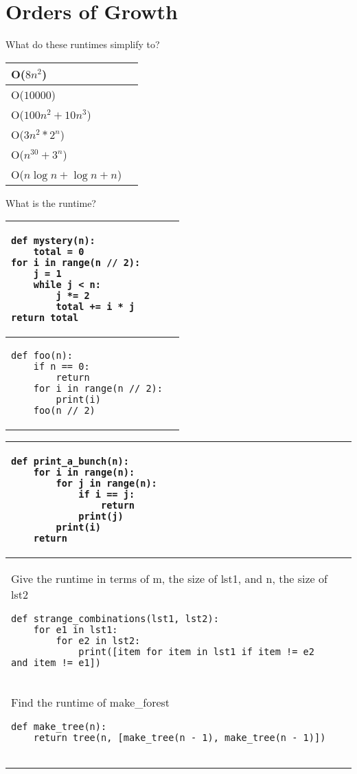\documentclass{exam}
\begin{document}
\section{Orders of Growth}
\begin{questions}
\item What do these runtimes simplify to? \newline
\begin{tabular}{ |p{4cm}|p{4cm}| } 
\hline 
O($8n^{2}$)&  \\ \hline
O($10000$) & \\ \hline
O($100n^{2} + 10n^{3}$) & \\ \hline
O($3n^{2}*2^{n}$) & \\ \hline
O($n^{30}+3^{n}$) & \\ \hline
O($n\log{n} + \log{n} + n$) & \\ \hline
\end{tabular}

\item What is the runtime?
\begin{center}

\begin{tabular}{ |p{13cm}|p{2cm}| } 
 \hline
 \begin{lstlisting}
def mystery(n):
    total = 0
for i in range(n // 2):
    j = 1
    while j < n:
        j *= 2
        total += i * j
return total
\end{lstlisting} &  \\  \hline

 \begin{lstlisting}
def foo(n):
    if n == 0:
        return
    for i in range(n // 2):
        print(i)
    foo(n // 2)
\end{lstlisting} &  \\  \hline
\end{tabular}

\begin{tabular}{ |p{13cm}|p{2cm}| } 
 \begin{lstlisting}
def print_a_bunch(n):
    for i in range(n):
        for j in range(n):
            if i == j:
                return
            print(j)
        print(i)
    return
\end{lstlisting} &  \\  \hline
Give the runtime in terms of m, the size of lst1, and n, the size of lst2
 \begin{lstlisting}
def strange_combinations(lst1, lst2):
    for e1 in lst1:
        for e2 in lst2:
            print([item for item in lst1 if item != e2 and item != e1])
\end{lstlisting} &  \\  \hline
Find the runtime of make\_forest
 \begin{lstlisting}
def make_tree(n):
    return tree(n, [make_tree(n - 1), make_tree(n - 1)])


\end{lstlisting}
\end{tabular}
\end{center}
\end{questions}
\end{document}
